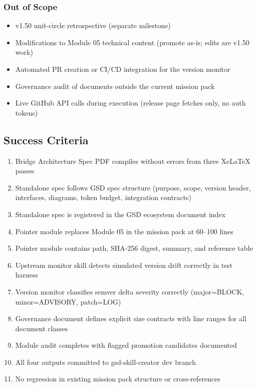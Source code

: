 \documentclass[11pt,letterpaper]{article}
\begin{document}
\subsubsection{Out of Scope}
\begin{itemize}[noitemsep]
  \item v1.50 unit-circle retrospective (separate milestone)
  \item Modifications to Module 05 technical content (promote as-is; edits are v1.50 work)
  \item Automated PR creation or CI/CD integration for the version monitor
  \item Governance audit of documents outside the current mission pack
  \item Live GitHub API calls during execution (release page fetches only, no auth tokens)
\end{itemize}

\subsection{Success Criteria}

\begin{enumerate}
  \item Bridge Architecture Spec PDF compiles without errors from three XeLaTeX passes
  \item Standalone spec follows GSD spec structure (purpose, scope, version header, interfaces, diagrams, token budget, integration contracts)
  \item Standalone spec is registered in the GSD ecosystem document index
  \item Pointer module replaces Module 05 in the mission pack at 60--100 lines
  \item Pointer module contains path, SHA-256 digest, summary, and reference table
  \item Upstream monitor skill detects simulated version drift correctly in test harness
  \item Version monitor classifies semver delta severity correctly (major=BLOCK, minor=ADVISORY, patch=LOG)
  \item Governance document defines explicit size contracts with line ranges for all document classes
  \item Module audit completes with flagged promotion candidates documented
  \item All four outputs committed to gsd-skill-creator dev branch
  \item No regression in existing mission pack structure or cross-references
\end{enumerate}
\end{document}
